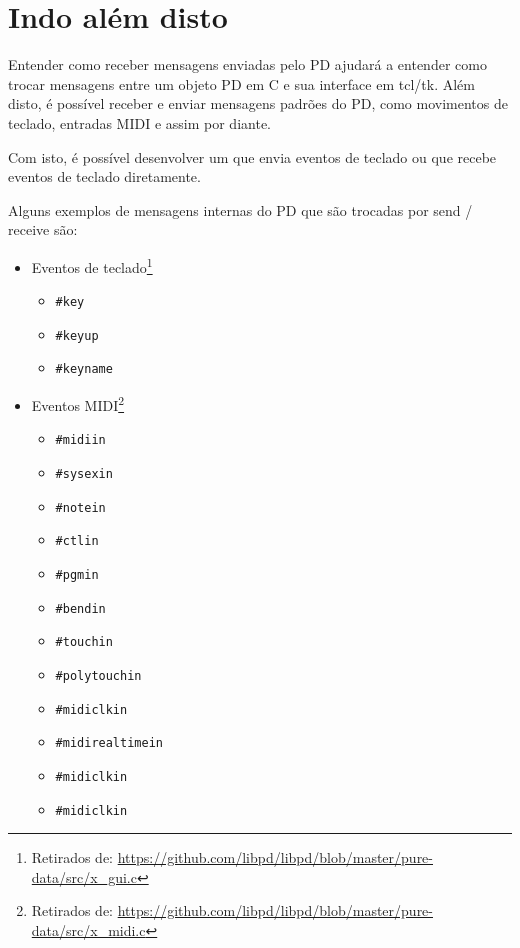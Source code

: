 \section{Indo além disto}

Entender como receber mensagens enviadas pelo PD ajudará a entender como trocar
mensagens entre um objeto PD em C e sua interface em tcl/tk.
Além disto, é possível receber e enviar mensagens padrões do PD, como movimentos
de teclado, entradas MIDI e assim por diante.

Com isto, é possível desenvolver um \external que envia eventos de teclado ou
que recebe eventos de teclado diretamente.

Alguns exemplos de mensagens internas do PD que são trocadas por send / receive
são:

\begin{itemize}
   \item Eventos de teclado\footnote{Retirados de: \url{https://github.com/libpd/libpd/blob/master/pure-data/src/x_gui.c}}
   \begin{itemize}
      \item \texttt{\#key}
      \item \texttt{\#keyup}
      \item \texttt{\#keyname}
   \end{itemize}
   \item Eventos MIDI\footnote{Retirados de: \url{https://github.com/libpd/libpd/blob/master/pure-data/src/x_midi.c}}
   \begin{itemize}
      \item \texttt{\#midiin}
      \item \texttt{\#sysexin}
      \item \texttt{\#notein}
      \item \texttt{\#ctlin}
      \item \texttt{\#pgmin}
      \item \texttt{\#bendin}
      \item \texttt{\#touchin}
      \item \texttt{\#polytouchin}
      \item \texttt{\#midiclkin}
      \item \texttt{\#midirealtimein}
      \item \texttt{\#midiclkin}
      \item \texttt{\#midiclkin}
   \end{itemize}
\end{itemize}

